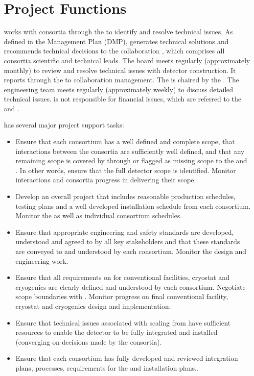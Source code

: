 \chapter{Project Functions}
\label{vl:tc-project}

 works with consortia through the  to identify and
resolve technical issues.  As defined in the  Management
Plan (DMP),   generates technical solutions and
recommends technical decisions to the  collaboration
, which comprises all consortia scientific and technical
leads. The board meets regularly (approximately monthly) to review and
resolve technical issues with detector construction. It reports
through the  to collaboration management. The 
 is chaired by the  . The
 engineering team meets regularly (approximately weekly) to
discuss detailed technical issues.   is not responsible for
financial issues, which are referred to the  and
.

 has several major project support tasks:
\begin{itemize}
\item Ensure that each consortium has a well defined and complete
  scope, that interactions between the consortia are sufficiently well
  defined, and that any remaining scope is covered by 
  through  or flagged as missing scope to the
   and . In other words, ensure that the full
  detector scope is identified. Monitor interactions and consortia
  progress in delivering their scope.
\item Develop an overall project 
  that includes reasonable production schedules, testing plans and a
  well developed installation schedule from each consortium. Monitor
  the  as well as individual consortium schedules.
\item Ensure that appropriate engineering and safety standards are
  developed, understood and agreed to by all key stakeholders and that these
  standards are conveyed to and understood by each
  consortium. Monitor the design and engineering work.
\item Ensure that all  requirements on  for
  conventional facilities, cryostat and cryogenics are clearly
  defined and understood by each consortium. Negotiate scope
  boundaries with . Monitor  progress on
  final conventional facility, cryostat and cryogenics
  design and implementation.
\item Ensure that technical issues associated with scaling from
   have sufficient resources to enable the detector to be fully integrated and
  installed (converging on
  decisions made by the consortia).
\item Ensure that each consortium has fully developed and reviewed
  integration plans,  processes, requirements for
  the  and installation plans..
\end{itemize}

